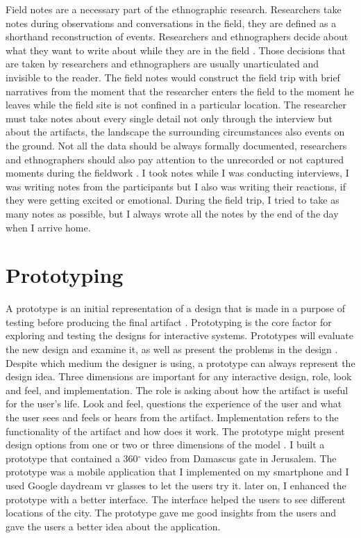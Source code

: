 Field notes are a necessary part of the ethnographic research. Researchers take notes during observations and conversations in the field, they are defined as a shorthand reconstruction of events. Researchers and ethnographers decide about what they want to write about while they are in the field \citep{Wolfinger2002OnExpectancies}. Those decisions that are taken by researchers and ethnographers are usually unarticulated and invisible to the reader. The field notes would construct the field trip with brief narratives from the moment that the researcher enters the field to the moment he leaves while the field site is not confined in a particular location. The researcher must take notes about every single detail not only through the interview but about the artifacts, the landscape the surrounding circumstances also events on the ground. Not all the data should be always formally documented, researchers and ethnographers should also pay attention to the unrecorded or not captured moments during the fieldwork \citep{Boulus-rdje2018StuckSite}. I took notes while I was conducting interviews, I was writing notes from the participants but I also was writing their reactions, if they were getting excited or emotional. During the field trip, I tried to take as many notes as possible, but I always wrote all the notes by the end of the day when I arrive home.   

\section{Prototyping}

A prototype is an initial representation of a design that is made in a purpose of testing before producing the final artifact \citep{Buchenau2000ExperiencePrototyping}. Prototyping is the core factor for exploring and testing the designs for interactive systems. Prototypes will evaluate the new design and examine it, as well as present the problems in the design \citep{Buchenau2000ExperiencePrototyping, Houde1997WhatPrototype}. Despite which medium the designer is using, a prototype can always represent the design idea. Three dimensions are important for any interactive design, role, look and feel, and implementation. The role is asking about how the artifact is useful for the user's life. Look and feel, questions the experience of the user and what the user sees and feels or hears from the artifact. Implementation refers to the functionality of the artifact and how does it work. The prototype might present design options from one or two or three dimensions of the model \citep{Houde1997WhatPrototype, Buchenau2000ExperiencePrototyping}. I built a prototype that contained a 360$^{\circ}$ video from Damascus gate in Jerusalem. The prototype was a mobile application that I implemented on my smartphone and I used Google daydream \acrshort{vr} glasses to let the users try it. later on, I enhanced the prototype with a better interface. The interface helped the users to see different locations of the city. The prototype gave me good insights from the users and gave the users a better idea about the application.

